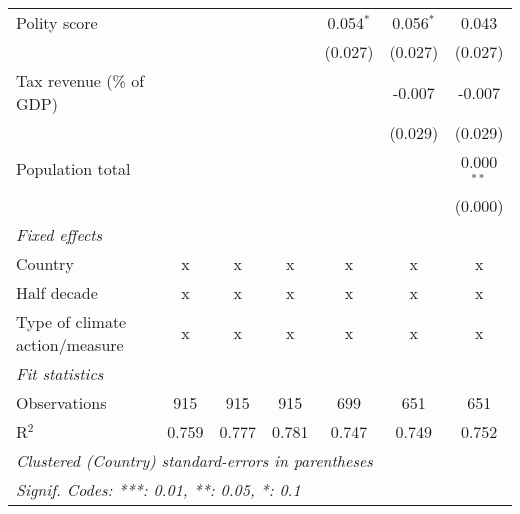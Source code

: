 \begin{tabular}{lcccccc}
   Polity score                                                           &         &                &                & 0.054$^{*}$    & 0.056$^{*}$    & 0.043\\   
                                                                          &         &                &                & (0.027)        & (0.027)        & (0.027)\\   
   Tax revenue (\% of GDP)                                                &         &                &                &                & -0.007         & -0.007\\   
                                                                          &         &                &                &                & (0.029)        & (0.029)\\   
   Population total                                                       &         &                &                &                &                & 0.000$^{**}$\\   
                                                                          &         &                &                &                &                & (0.000)\\   
   \emph{Fixed effects}\\
   Country                                                                & x       & x              & x              & x              & x              & x\\  
   Half decade                                                            & x       & x              & x              & x              & x              & x\\  
   Type of climate action/measure                                         & x       & x              & x              & x              & x              & x\\  
   \midrule \emph{Fit statistics}\\
   Observations                                                           & 915     & 915            & 915            & 699            & 651            & 651\\  
   R$^2$                                                                  & 0.759   & 0.777          & 0.781          & 0.747          & 0.749          & 0.752\\  
   \midrule
   \multicolumn{7}{l}{\emph{Clustered (Country) standard-errors in parentheses}}\\
   \multicolumn{7}{l}{\emph{Signif. Codes: ***: 0.01, **: 0.05, *: 0.1}}\\
\end{tabular}
\par\endgroup


